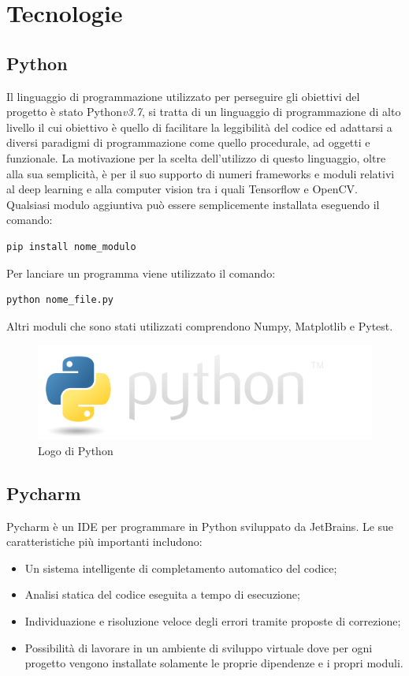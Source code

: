 \section{Tecnologie}
\subsection{Python}
Il linguaggio di programmazione utilizzato per perseguire gli obiettivi del progetto è stato Python\textit{v3.7}, si tratta di un linguaggio di programmazione di alto livello il cui obiettivo è quello di facilitare la leggibilità del codice ed adattarsi a diversi paradigmi di programmazione come quello procedurale, ad oggetti e funzionale. La motivazione per la scelta dell'utilizzo di questo linguaggio, oltre alla sua semplicità, è per il suo supporto di numeri frameworks e moduli relativi al deep learning e alla computer vision tra i quali Tensorflow e OpenCV. Qualsiasi modulo aggiuntiva può essere semplicemente installata eseguendo il comando:
\begin{verbatim}
pip install nome_modulo
\end{verbatim}
Per lanciare un programma viene utilizzato il comando:
\begin{verbatim}
python nome_file.py
\end{verbatim}
Altri moduli che sono stati utilizzati comprendono Numpy, Matplotlib e Pytest.
\begin{figure}[H]
	\centering
	\includegraphics[width=0.7\linewidth]{images/logo-python.png}
	\caption{Logo di Python}
	\label{Logo di Python}
\end{figure}
\subsection{Pycharm}
Pycharm è un IDE per programmare in Python sviluppato da JetBrains. Le sue caratteristiche più importanti includono: 
\begin{itemize}
\item Un sistema intelligente di completamento automatico del codice;
\item Analisi statica del codice eseguita a tempo di esecuzione;
\item Individuazione e risoluzione veloce degli errori tramite proposte di correzione;
\item Possibilità di lavorare in un ambiente di sviluppo virtuale dove per ogni progetto vengono installate solamente le proprie dipendenze e i propri moduli. 
\end{itemize}

